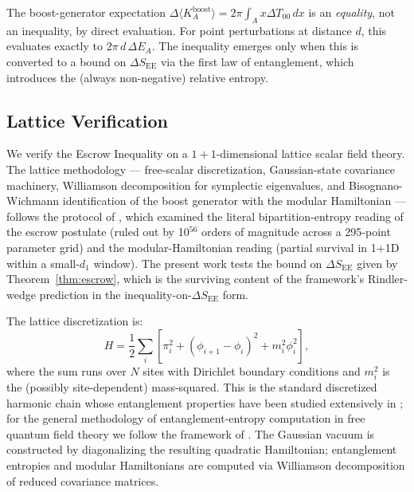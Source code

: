 \documentclass[11pt]{article}
\begin{document}
\begin{remark}
\label{rem:K_equality}
The boost-generator expectation $\Delta\langle K_A^{\mathrm{boost}}\rangle = 2\pi \int_A x \Delta T_{00} \, dx$ is an \emph{equality}, not an inequality, by direct evaluation. For point perturbations at distance $d$, this evaluates exactly to $2\pi \, d \, \Delta E_A$. The inequality emerges only when this is converted to a bound on $\Delta S_{\mathrm{EE}}$ via the first law of entanglement, which introduces the (always non-negative) relative entropy.
\end{remark}

\subsection{Lattice Verification}
\label{sec:lattice}

We verify the Escrow Inequality on a $1{+}1$-dimensional lattice scalar field theory. The lattice methodology — free-scalar discretization, Gaussian-state covariance machinery, Williamson decomposition for symplectic eigenvalues, and Bisognano-Wichmann identification of the boost generator with the modular Hamiltonian — follows the protocol of \cite{Whitmer2026Lattice}, which examined the literal bipartition-entropy reading of the escrow postulate (ruled out by 10$^{56}$ orders of magnitude across a 295-point parameter grid) and the modular-Hamiltonian reading (partial survival in 1+1D within a small-$d_1$ window). The present work tests the bound on $\Delta S_{\mathrm{EE}}$ given by Theorem~\ref{thm:escrow}, which is the surviving content of the framework's Rindler-wedge prediction in the inequality-on-$\Delta S_{\mathrm{EE}}$ form.

The lattice discretization is:
\begin{equation}
H = \frac{1}{2}\sum_i \left[\pi_i^2 + (\phi_{i+1} - \phi_i)^2 + m_i^2 \phi_i^2\right],
\end{equation}
where the sum runs over $N$ sites with Dirichlet boundary conditions and $m_i^2$ is the (possibly site-dependent) mass-squared. This is the standard discretized harmonic chain whose entanglement properties have been studied extensively in \cite{Audenaert2002}; for the general methodology of entanglement-entropy computation in free quantum field theory we follow the framework of \cite{CasiniHuerta2009}. The Gaussian vacuum is constructed by diagonalizing the resulting quadratic Hamiltonian; entanglement entropies and modular Hamiltonians are computed via Williamson decomposition of reduced covariance matrices.
\end{document}
